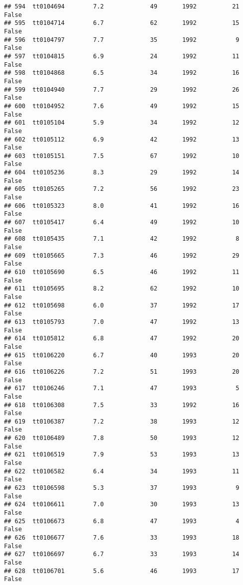 \documentclass[
]{article}
\begin{document}
\begin{verbatim}
## 594  tt0104694        7.2             49       1992          21   False
## 595  tt0104714        6.7             62       1992          15   False
## 596  tt0104797        7.7             35       1992           9   False
## 597  tt0104815        6.9             24       1992          11   False
## 598  tt0104868        6.5             34       1992          16   False
## 599  tt0104940        7.7             29       1992          26   False
## 600  tt0104952        7.6             49       1992          15   False
## 601  tt0105104        5.9             34       1992          12   False
## 602  tt0105112        6.9             42       1992          13   False
## 603  tt0105151        7.5             67       1992          10   False
## 604  tt0105236        8.3             29       1992          14   False
## 605  tt0105265        7.2             56       1992          23   False
## 606  tt0105323        8.0             41       1992          16   False
## 607  tt0105417        6.4             49       1992          10   False
## 608  tt0105435        7.1             42       1992           8   False
## 609  tt0105665        7.3             46       1992          29   False
## 610  tt0105690        6.5             46       1992          11   False
## 611  tt0105695        8.2             62       1992          10   False
## 612  tt0105698        6.0             37       1992          17   False
## 613  tt0105793        7.0             47       1992          13   False
## 614  tt0105812        6.8             47       1992          20   False
## 615  tt0106220        6.7             40       1993          20   False
## 616  tt0106226        7.2             51       1993          20   False
## 617  tt0106246        7.1             47       1993           5   False
## 618  tt0106308        7.5             33       1992          16   False
## 619  tt0106387        7.2             38       1993          12   False
## 620  tt0106489        7.8             50       1993          12   False
## 621  tt0106519        7.9             53       1993          13   False
## 622  tt0106582        6.4             34       1993          11   False
## 623  tt0106598        5.3             37       1993           9   False
## 624  tt0106611        7.0             30       1993          13   False
## 625  tt0106673        6.8             47       1993           4   False
## 626  tt0106677        7.6             33       1993          18   False
## 627  tt0106697        6.7             33       1993          14   False
## 628  tt0106701        5.6             46       1993          17   False

\end{verbatim}
\end{document}
